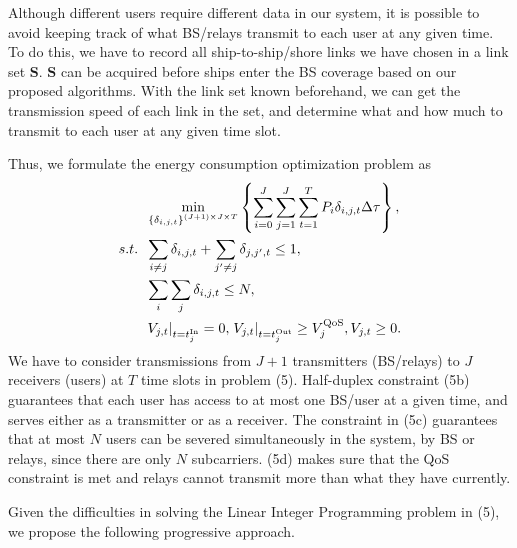 \documentclass[conference]{IEEEtran}
\begin{document}
 Although different users require different data in our system, it is possible to avoid keeping track of what BS/relays transmit to each user at any given time. To do this, we have to record all ship-to-ship/shore links we have chosen in a link set ${\mathbf{S}}$. ${\mathbf{S}}$ can be acquired before ships enter the BS coverage based on our proposed algorithms. With the link set known beforehand, we can get the transmission speed of each link in the set, and determine what and how much to transmit to each user at any given time slot.
 
 Thus, we formulate the energy consumption optimization problem as
 \begin{subequations}
 \begin{align}
 & \mathop {\min }\limits_{{\left\{ {{\delta _{i,j,t}}} \right\}^{\left( {J + 1} \right) \times J \times T}}} \left\{ {\sum\limits_{i = 0}^J {\sum\limits_{j = 1}^J {\sum\limits_{t = 1}^{T} {{P_{i}}\delta _{i,j,t} \Delta \tau } } } } \right\} ,\\
  {s.t.} \;\; &\sum\limits_{i \ne j} {{{\delta _{i,j,t}}} } + \sum\limits_{j' \ne j} { {{\delta _{j,j',t}}} \le {1}} ,\\
  \;\;\;\;\;\; &\sum\limits_i {\sum\limits_j { {{\delta _{i,j,t}}} } } \le N ,\\
  \;\;\;\;\;\; &{{{\left. {{V_{j,t}}} \right|}_{t = t_j^{{\rm{In}}}}} = 0, \left. {{V_{j,t}}} \right|_{t = t_j^{{\rm{Out}}}}} \ge V_j^{\rm{QoS}}, {V_{j,t}} \ge 0.
 \end{align}
 \end{subequations}
 We have to consider transmissions from ${J + 1}$ transmitters (BS/relays) to $J$ receivers (users) at $T$ time slots in problem (5). 
 Half-duplex constraint (5b) guarantees that each user has access to at most one BS/user at a given time, and serves either as a transmitter or as a receiver. The constraint in (5c) guarantees that at most $N$ users can be severed simultaneously in the system, by BS or relays, since there are only $N$ subcarriers. (5d) makes sure that the QoS constraint is met and relays cannot transmit more than what they have currently.
 
 Given the difficulties in solving the Linear Integer Programming problem in (5), we propose the following progressive approach. 
 
 
\end{document}
